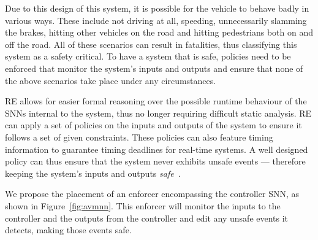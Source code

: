 Due to this design of this system, it is possible for the vehicle to behave badly in various ways. 
These include not driving at all, speeding, unnecessarily slamming the brakes, hitting other vehicles on the road and hitting pedestrians both on and off the road.
All of these scenarios can result in fatalities, thus classifying this system as a safety critical.
To have a system that is safe, policies need to be enforced that monitor the system's inputs and outputs and ensure that none of the above scenarios take place under any circumstances.

\ac{RE} allows for easier formal reasoning over the possible runtime behaviour of the \acp{SNN} internal to the system, thus no longer requiring difficult static analysis.
\ac{RE} can apply a set of policies on the inputs and outputs of the system to ensure it follows a set of given constraints. %
These policies can also feature timing information to guarantee timing deadlines for real-time systems.
A well designed policy can thus ensure that the system never exhibits unsafe events --- therefore keeping the system's inputs and outputs \textit{safe}~\cite{EstSafeCriteria2003}. 

We propose the placement of an enforcer encompassing the controller \ac{SNN}, as shown in Figure~\ref{fig:avmnn}.
This enforcer will monitor the inputs to the controller and the outputs from the controller and edit any unsafe events it detects, making those events safe.







